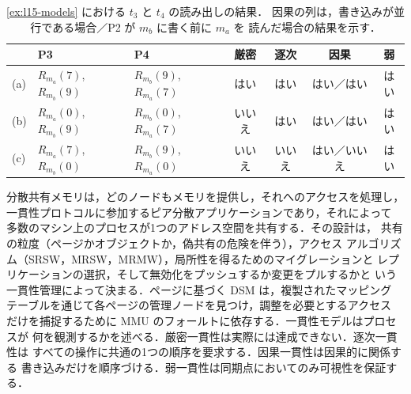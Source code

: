 \documentclass[../main.tex]{subfiles}
\begin{document}
\begin{table}[htbp]
  \centering
  \caption{\cref{ex:l15-models} における $t_3$ と $t_4$ の読み出しの結果．
    因果の列は，書き込みが並行である場合／P2 が $m_b$ に書く前に $m_a$ を
    読んだ場合の結果を示す．}
  \label{tab:l15-models}
  \small
  \begin{tabular}{@{}lllcccc@{}}
    \toprule
    & P3 & P4 & 厳密 & 逐次 & 因果 & 弱 \\
    \midrule
    (a) & $R_{m_a}(7)$, $R_{m_b}(9)$ & $R_{m_b}(9)$, $R_{m_a}(7)$ & はい
      & はい & はい／はい & はい \\
    (b) & $R_{m_a}(0)$, $R_{m_b}(9)$ & $R_{m_b}(0)$, $R_{m_a}(7)$ & いいえ
      & はい & はい／はい & はい \\
    (c) & $R_{m_a}(7)$, $R_{m_b}(0)$ & $R_{m_b}(9)$, $R_{m_a}(0)$ & いいえ
      & いいえ & はい／いいえ & はい \\
    \bottomrule
  \end{tabular}
\end{table}

\begin{keypoint}[章のまとめ]
  分散共有メモリは，どのノードもメモリを提供し，それへのアクセスを処理し，
  一貫性プロトコルに参加するピア分散アプリケーションであり，それによって
  多数のマシン上のプロセスが1つのアドレス空間を共有する．その設計は，
  共有の粒度（ページかオブジェクトか，偽共有の危険を伴う），アクセス
  アルゴリズム（SRSW，MRSW，MRMW），局所性を得るためのマイグレーションと
  レプリケーションの選択，そして無効化をプッシュするか変更をプルするかと
  いう一貫性管理によって決まる．ページに基づく DSM は，複製されたマッピング
  テーブルを通じて各ページの管理ノードを見つけ，調整を必要とするアクセス
  だけを捕捉するために MMU のフォールトに依存する．一貫性モデルはプロセスが
  何を観測するかを述べる．厳密一貫性は実際には達成できない．逐次一貫性は
  すべての操作に共通の1つの順序を要求する．因果一貫性は因果的に関係する
  書き込みだけを順序づける．弱一貫性は同期点においてのみ可視性を保証する．
\end{keypoint}
\end{document}
